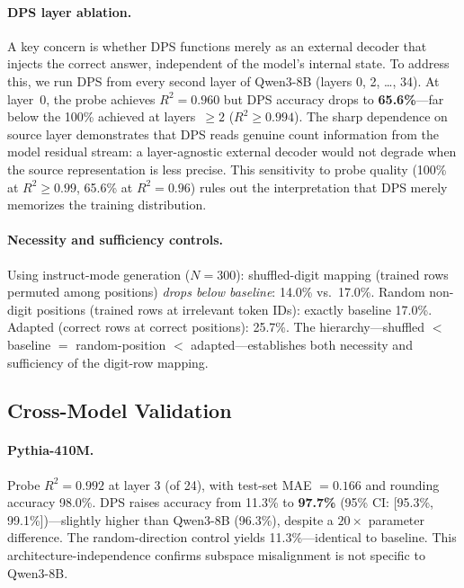 \documentclass{article}
\begin{document}
\paragraph{DPS layer ablation.}
A key concern is whether DPS functions merely as an external decoder that injects the
correct answer, independent of the model's internal state.
To address this, we run DPS from every second layer of Qwen3-8B (layers 0, 2, \ldots, 34).
At layer~0, the probe achieves $R^2 = 0.960$ but DPS accuracy drops to
\textbf{65.6\%}---far below the 100\% achieved at layers~$\geq 2$ ($R^2 \geq 0.994$).
The sharp dependence on source layer demonstrates that DPS reads genuine count information
from the model residual stream: a layer-agnostic external decoder would not degrade
when the source representation is less precise.
This sensitivity to probe quality (100\% at $R^2 \geq 0.99$, 65.6\% at $R^2 = 0.96$)
rules out the interpretation that DPS merely memorizes the training distribution.

\paragraph{Necessity and sufficiency controls.}
Using instruct-mode generation ($N = 300$):
shuffled-digit mapping (trained rows permuted among positions) \emph{drops below baseline}: 14.0\% vs.\ 17.0\%.
Random non-digit positions (trained rows at irrelevant token IDs): exactly baseline 17.0\%.
Adapted (correct rows at correct positions): 25.7\%.
The hierarchy---shuffled $<$ baseline $=$ random-position $<$ adapted---establishes both necessity and sufficiency of the digit-row mapping.

\subsection{Cross-Model Validation}
\label{sec:crossmodel}

\paragraph{Pythia-410M.}
Probe $R^2 = 0.992$ at layer 3 (of 24), with test-set MAE $= 0.166$ and rounding accuracy 98.0\%.
DPS raises accuracy from 11.3\% to \textbf{97.7\%} (95\% CI: [95.3\%, 99.1\%])---slightly
higher than Qwen3-8B (96.3\%), despite a $20\times$ parameter difference.
The random-direction control yields 11.3\%---identical to baseline.
This architecture-independence confirms subspace misalignment is not specific to Qwen3-8B.
\end{document}
